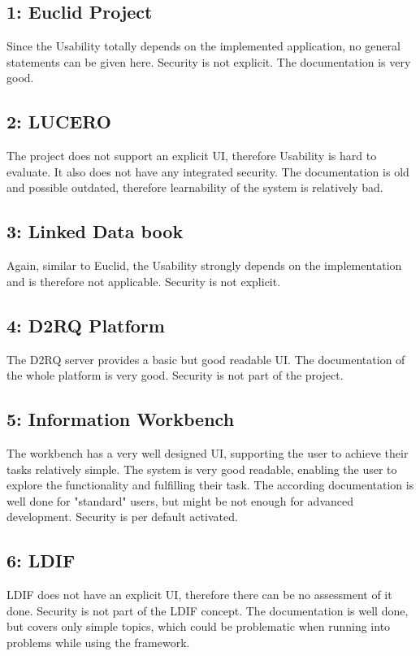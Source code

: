 \subsection*{1: Euclid Project}
Since the Usability totally depends on the implemented application, no general 
statements can be given here. Security is not explicit. The documentation is very 
good.

\subsection*{2: LUCERO}
The project does not support an explicit UI, therefore Usability is hard to 
evaluate. It also does not have any integrated security. The documentation is old 
and possible outdated, therefore learnability of the system is relatively bad.

\subsection*{3: Linked Data book}
Again, similar to Euclid, the Usability strongly depends on the implementation and 
is therefore not applicable. Security is not explicit.

\subsection*{4: D2RQ Platform}
The D2RQ server provides a basic but good readable UI. The documentation of the 
whole platform is very good. Security is not part of the project.

\subsection*{5: Information Workbench}
The workbench has a very well designed UI, supporting the user to achieve their 
tasks relatively simple. The system is very good readable, enabling the user to 
explore the functionality and fulfilling their task. The according documentation 
is well done for "standard" users, but might be not enough for advanced 
development. Security is per default activated.

\subsection*{6: LDIF}
LDIF does not have an explicit UI, therefore there can be no assessment of it 
done. Security is not part of the LDIF concept. The documentation is well done, 
but covers only simple topics, which could be problematic when running into 
problems while using the framework.

